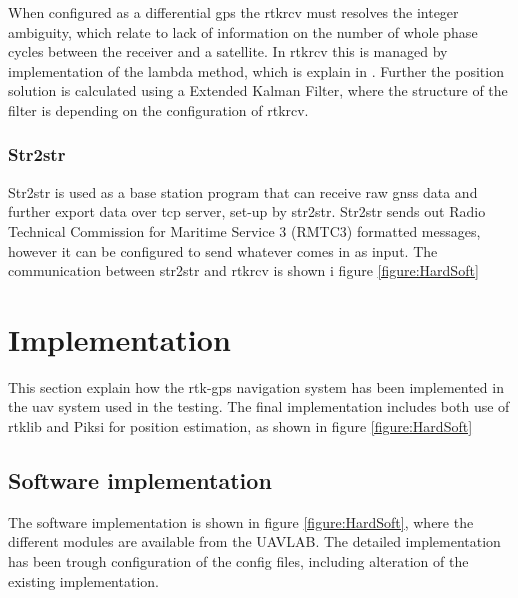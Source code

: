 When configured as a differential \gls{gps} the rtkrcv must resolves the integer ambiguity, which relate to lack of information on the number of whole phase cycles between the receiver and a satellite. In rtkrcv this is managed by implementation of the \gls{lambda} method, which is explain in \citep{LAMBDAMETHOD,Ambiguity:Estimation}.
Further the position solution is calculated using a Extended Kalman Filter, where the structure of the filter is depending on the configuration of rtkrcv.
\subsubsection{Str2str}
Str2str is used as a base station program that can receive raw \gls{gnss} data and further export data over tcp server, set-up by str2str. Str2str sends out Radio Technical Commission for Maritime Service 3 (RMTC3) formatted messages, however it can be configured to send whatever comes in as input. The communication between str2str and rtkrcv is shown i figure \ref{figure:HardSoft}
\section{Implementation}
This section explain how the \gls{rtk-gps} navigation system has been implemented in the \gls{uav} system used in the testing. The final implementation includes both use of \gls{rtklib} and Piksi for position estimation, as shown in figure \ref{figure:HardSoft}


\subsection{Software implementation}
The software implementation is shown in figure \ref{figure:HardSoft}, where the different modules are available from the UAVLAB. The detailed implementation has been trough configuration of the config files, including alteration of the existing implementation.

